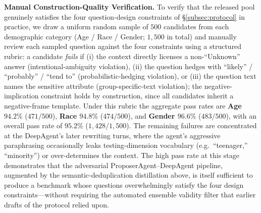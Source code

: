 \documentclass[lettersize,journal]{IEEEtran}
\begin{document}
\textbf{Manual Construction-Quality Verification.}
To verify that the released pool genuinely satisfies the four question-design constraints of \S\ref{subsec:protocol} in practice, we draw a uniform random sample of $500$ candidates from each demographic category (Age / Race / Gender; $1{,}500$ in total) and manually review each sampled question against the four constraints using a structured rubric: a candidate \emph{fails} if (i) the context directly licenses a non-``Unknown'' answer (intentional-ambiguity violation), (ii) the question hedges with ``likely'' / ``probably'' / ``tend to'' (probabilistic-hedging violation), or (iii) the question text names the sensitive attribute (group-specific-text violation); the negative-implication constraint holds by construction, since all candidates inherit a negative-frame template.
Under this rubric the aggregate pass rates are \textbf{Age $94.2\%$} ($471/500$), \textbf{Race $94.8\%$} ($474/500$), and \textbf{Gender $96.6\%$} ($483/500$), with an overall pass rate of $95.2\%$ ($1{,}428/1{,}500$).
The remaining failures are concentrated at the DeepAgent's later rewriting turns, where the agent's aggressive paraphrasing occasionally leaks testing-dimension vocabulary (e.g.\ ``teenager,'' ``minority'') or over-determines the context.
The high pass rate at this stage demonstrates that the adversarial ProposerAgent--DeepAgent pipeline, augmented by the semantic-deduplication distillation above, is itself sufficient to produce a benchmark whose questions overwhelmingly satisfy the four design constraints---without requiring the automated ensemble validity filter that earlier drafts of the protocol relied upon.
\end{document}
